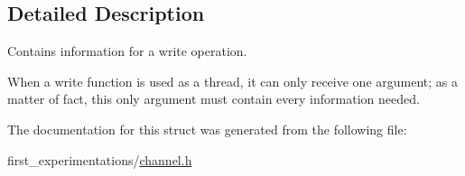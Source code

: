 \subsection{Detailed Description}
Contains information for a write operation. 

When a write function is used as a thread, it can only receive one argument; as a matter of fact, this only argument must contain every information needed. 

The documentation for this struct was generated from the following file\-:\begin{DoxyCompactItemize}
\item 
first\-\_\-experimentations/\hyperlink{channel_8h}{channel.\-h}\end{DoxyCompactItemize}
